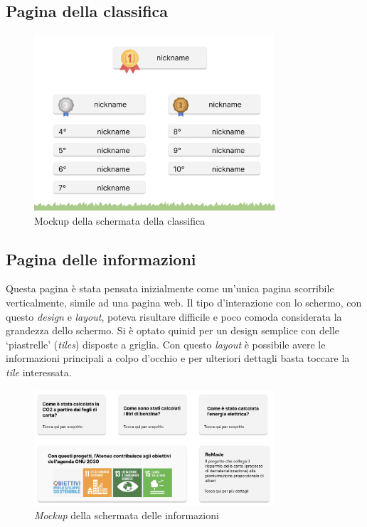 \subsection{Pagina della classifica}
\begin{figure}
    \centering
    \includegraphics[width=0.8\textwidth]{img/topchartPage.png}
    \caption{Mockup della schermata della classifica}
    \label{fig:chartPage}
\end{figure}
%
\subsection{Pagina delle informazioni}
Questa pagina è stata pensata inizialmente come un'unica pagina scorribile verticalmente, simile ad una pagina web. Il tipo d'interazione con lo schermo, con questo \textit{design} e \textit{layout}, poteva risultare difficile e poco comoda considerata la grandezza dello schermo.
Si è optato quinid per un design semplice con delle \enquote*{piastrelle} (\textit{tiles}) disposte a griglia. Con questo \textit{layout} è possibile avere le informazioni principali a colpo d'occhio e per ulteriori dettagli basta toccare la \textit{tile} interessata.

\begin{figure} [h]
    \centering
    \includegraphics[width=0.8\textwidth]{img/infoPage.png}
    \caption{\textit{Mockup} della schermata delle informazioni}
    \label{fig:infoPage}
\end{figure}

